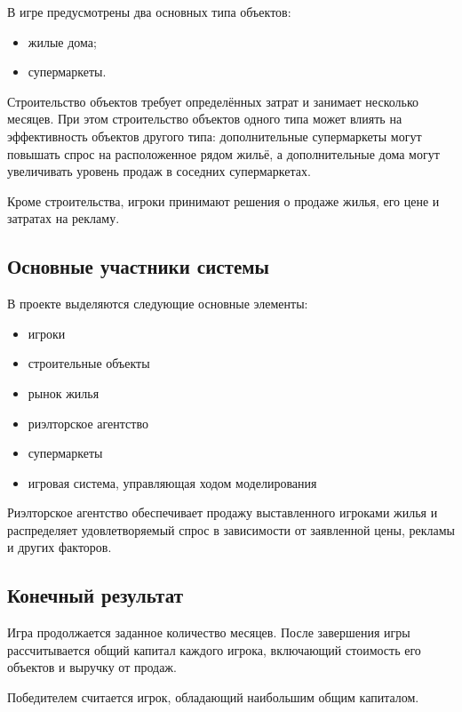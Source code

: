 \documentclass[
]{article}
\providecommand{\tightlist}{%
  \setlength{\itemsep}{0pt}\setlength{\parskip}{0pt}}
\begin{document}
В игре предусмотрены два основных типа объектов:

\begin{itemize}
\tightlist
\item
  жилые дома;
\item
  супермаркеты.
\end{itemize}

Строительство объектов требует определённых затрат и занимает несколько
месяцев. При этом строительство объектов одного типа может влиять на
эффективность объектов другого типа: дополнительные супермаркеты могут
повышать спрос на расположенное рядом жильё, а дополнительные дома могут
увеличивать уровень продаж в соседних супермаркетах.

Кроме строительства, игроки принимают решения о продаже жилья, его цене
и затратах на рекламу.

\subsection{Основные участники
системы}\label{ux43eux441ux43dux43eux432ux43dux44bux435-ux443ux447ux430ux441ux442ux43dux438ux43aux438-ux441ux438ux441ux442ux435ux43cux44b}

В проекте выделяются следующие основные элементы:

\begin{itemize}
\tightlist
\item
  игроки
\item
  строительные объекты
\item
  рынок жилья
\item
  риэлторское агентство
\item
  супермаркеты
\item
  игровая система, управляющая ходом моделирования
\end{itemize}

Риэлторское агентство обеспечивает продажу выставленного игроками жилья
и распределяет удовлетворяемый спрос в зависимости от заявленной цены,
рекламы и других факторов.

\subsection{Конечный
результат}\label{ux43aux43eux43dux435ux447ux43dux44bux439-ux440ux435ux437ux443ux43bux44cux442ux430ux442}

Игра продолжается заданное количество месяцев. После завершения игры
рассчитывается общий капитал каждого игрока, включающий стоимость его
объектов и выручку от продаж.

Победителем считается игрок, обладающий наибольшим общим капиталом.
\end{document}
